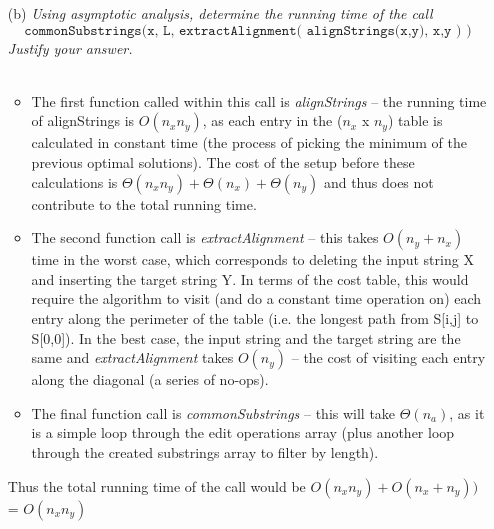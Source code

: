 \documentclass[11pt]{article} \setlength{\oddsidemargin}{0in}
\begin{document}
{\begin{enumerate}
  \item[(b)] \textit{Using asymptotic analysis, determine the running
      time of the call $$\texttt{commonSubstrings(x, L,
        extractAlignment( alignStrings(x,y), x,y ) )}$$ Justify your
      answer.}
    \\\\
    \begin{itemize}
    \item The first function called within this call is \textit{alignStrings} -- the running time of alignStrings is $O(n_xn_y)$, as each entry in the ($n_x$ x $n_y$) table is calculated in constant time (the process of picking the minimum of the previous optimal solutions). The cost of the setup before these calculations is $\Theta(n_xn_y) + \Theta(n_x) + \Theta(n_y)$ and thus does not contribute to the total running time. 
    \item The second function call is \textit{extractAlignment} -- this takes $O(n_y+n_x)$ time in the worst case, which corresponds to deleting the input string X and inserting the target string Y. In terms of the cost table, this would require the algorithm to visit (and do a constant time operation on) each entry along the perimeter of the table (i.e. the longest path from S[i,j] to S[0,0]). In the best case, the input string and the target string are the same and \textit{extractAlignment} takes $O(n_y)$ -- the cost of visiting each entry along the diagonal (a series of no-ops). 
    \item The final function call is \textit{commonSubstrings} -- this will take $\Theta(n_a)$, as it is a simple loop through the edit operations array (plus another loop through the created substrings array to filter by length).
    \end{itemize}

    Thus the total running time of the call would be $O(n_xn_y) + O(n_x + n_y))$ = $O(n_xn_y)$
    
    \pagebreak


\end{enumerate}}
\end{document}
